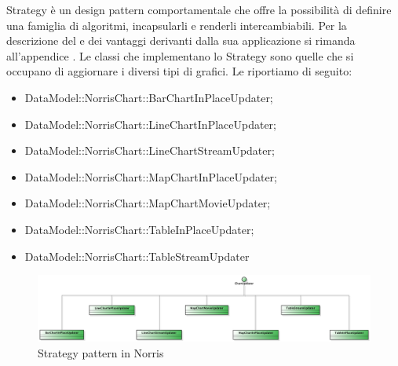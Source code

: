 			Strategy è un design pattern comportamentale che offre la possibilità di definire una famiglia di
algoritmi, incapsularli e renderli intercambiabili. Per la descrizione del  e dei vantaggi derivanti dalla sua applicazione si rimanda all'appendice .
					Le classi che implementano lo Strategy sono quelle che si occupano di aggiornare i diversi tipi di grafici. Le riportiamo di seguito:
					\begin{itemize}
					\item DataModel::NorrisChart::BarChartInPlaceUpdater;
					\item DataModel::NorrisChart::LineChartInPlaceUpdater;
					\item DataModel::NorrisChart::LineChartStreamUpdater;
					\item DataModel::NorrisChart::MapChartInPlaceUpdater;
					\item DataModel::NorrisChart::MapChartMovieUpdater;
					\item DataModel::NorrisChart::TableInPlaceUpdater;
					\item DataModel::NorrisChart::TableStreamUpdater
				\end{itemize}
				\begin{figure}[H]\centering
	        		\includegraphics[width=\textwidth]{SpecificaTecnica/Pics/DesignPatternNorris/Strategy}
	        		\caption{Strategy pattern in Norris}
	    		\end{figure}
	    			
		
